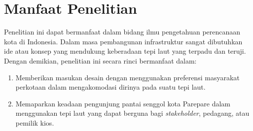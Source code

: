 \documentclass[../projects/thesis.tex]{subfiles}
\begin{document}
\section{Manfaat Penelitian}
Penelitian ini dapat bermanfaat dalam bidang ilmu pengetahuan perencanaan kota di Indonesia. Dalam masa pembangunan infrastruktur sangat dibutuhkan ide atau konsep yang mendukung keberadaan tepi laut yang terpadu dan teruji. Dengan demikian, penelitian ini secara rinci bermanfaat dalam:

\begin{enumerate}
    \item Memberikan masukan desain dengan menggunakan preferensi masyarakat perkotaan dalam mengakomodasi dirinya pada suatu tepi laut.
    \item Memaparkan keadaan pengunjung pantai senggol kota Parepare dalam menggunakan tepi laut yang dapat berguna bagi \textit{stakeholder}, pedagang, atau pemilik kios.
\end{enumerate}





\end{document}
